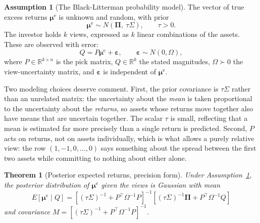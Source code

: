 \documentclass[11pt]{article}
\newtheorem{theorem}{Theorem}
\theoremstyle{remark}
\theoremstyle{definition}
\newtheorem{assumption}{Assumption}
\begin{document}
\begin{assumption}[The Black-Litterman probability model]
\label{ass:bl}
The vector of true excess returns $\boldsymbol\mu^{\mathrm{e}}$ is unknown and random, with prior
\begin{equation}
\label{eq:prior}
\boldsymbol\mu^{\mathrm{e}} \sim N(\boldsymbol\Pi,\ \tau\Sigma), \qquad \tau > 0.
\end{equation}
The investor holds $k$ views, expressed as $k$ linear combinations of the assets. These are observed with error:
\begin{equation}
\label{eq:views}
Q = P\boldsymbol\mu^{\mathrm{e}} + \boldsymbol\varepsilon, \qquad \boldsymbol\varepsilon \sim N(0,\Omega),
\end{equation}
where $P \in \mathbb{R}^{k\times n}$ is the pick matrix, $Q \in \mathbb{R}^k$ the stated magnitudes, $\Omega \succ 0$ the view-uncertainty matrix, and $\boldsymbol\varepsilon$ is independent of $\boldsymbol\mu^{\mathrm{e}}$.
\end{assumption}

Two modeling choices deserve comment. First, the prior covariance is $\tau\Sigma$ rather than an unrelated matrix: the uncertainty about the \emph{mean} is taken proportional to the uncertainty about the \emph{returns}, so assets whose returns move together also have means that are uncertain together. The scalar $\tau$ is small, reflecting that a mean is estimated far more precisely than a single return is predicted. Second, $P$ acts on returns, not on assets individually, which is what allows a purely relative view: the row $(1,-1,0,\dots,0)$ says something about the spread between the first two assets while committing to nothing about either alone.

\begin{theorem}[Posterior expected returns, precision form]
\label{thm:posterior}
Under Assumption~\ref{ass:bl}, the posterior distribution of $\boldsymbol\mu^{\mathrm{e}}$ given the views is Gaussian with mean
\begin{equation}
\label{eq:posterior}
E[\boldsymbol\mu^{\mathrm{e}} \mid Q] = \left[(\tau\Sigma)^{-1} + P^\top\Omega^{-1}P\right]^{-1}\left[(\tau\Sigma)^{-1}\boldsymbol\Pi + P^\top\Omega^{-1}Q\right]
\end{equation}
and covariance $M = \left[(\tau\Sigma)^{-1} + P^\top\Omega^{-1}P\right]^{-1}$.
\end{theorem}
\end{document}
